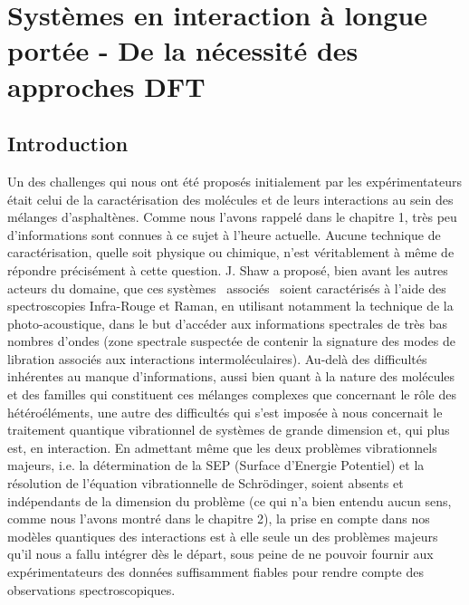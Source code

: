 	\chapter[Interactions à longue portée]{Systèmes en interaction à longue portée - De la nécessité des approches DFT}
	\minitoc
	\restoregeometry
	
	\newpage
	
	\section*{Introduction}
	
	Un des challenges qui nous ont été proposés initialement par les expérimentateurs était celui de la caractérisation des molécules et de leurs interactions au sein des mélanges d’asphaltènes. Comme nous l’avons rappelé dans le chapitre 1, très peu d’informations sont connues à ce sujet à l’heure actuelle. Aucune technique de caractérisation, quelle soit physique ou chimique, n’est véritablement à même de répondre précisément à cette question. J. Shaw a proposé, bien avant les autres acteurs du domaine, que ces systèmes \og associés \fg{} soient caractérisés à l’aide des spectroscopies Infra-Rouge et Raman, en utilisant notamment la technique de la photo-acoustique, dans le but d’accéder aux informations spectrales de très bas nombres d’ondes (zone spectrale suspectée de contenir la signature des modes de libration associés aux interactions intermoléculaires). Au-delà des difficultés inhérentes au manque d’informations, aussi bien quant à la nature des molécules et des familles qui constituent ces mélanges complexes que concernant le rôle des hétéroéléments, une autre des difficultés qui s’est imposée à nous concernait le traitement quantique vibrationnel de systèmes de grande dimension et, qui plus est, en interaction. En admettant même que les deux problèmes vibrationnels majeurs, i.e. la détermination de la SEP (Surface d'Energie Potentiel) et la résolution de l’équation vibrationnelle de Schr\"{o}dinger, soient absents et indépendants de la dimension du problème (ce qui n’a bien entendu aucun sens, comme nous l’avons montré dans le chapitre 2), la prise en compte dans nos modèles quantiques des interactions est à elle seule un des problèmes majeurs qu’il nous a fallu intégrer dès le départ, sous peine de ne pouvoir fournir aux expérimentateurs des données suffisamment fiables pour rendre compte des observations spectroscopiques. 
	
